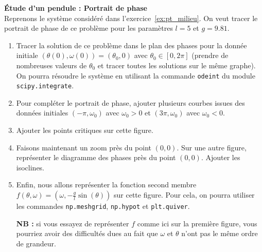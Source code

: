 \documentclass[12pt]{article}
\begin{document}
\begin{exo}\textbf{\'Etude d'un pendule : Portrait de phase}
  \label{ex:pendule}
  \\
  Reprenons le syst\`eme consid\'er\'e dans l'exercice~\ref{ex:pt_milieu}.
On veut tracer le portrait de phase de ce probl\`eme pour les param\`etres
$l=5$ et $g=9.81$.

\begin{enumerate}
\item Tracer la solution de ce probl\`eme dans le plan des phases pour la donn\'ee initiale
  $(\theta(0),\omega(0)) = (\theta_0,0)$ avec $\theta_0 \in [0 , 2\pi]$
  (prendre de nombreuses valeurs de $\theta_0$ et tracer toutes les solutions sur le m\^eme graphe).
  On pourra r\'esoudre le syst\`eme en utilisant la commande \texttt{odeint} du module \texttt{scipy.integrate}. 

\item Pour compl\'eter le portrait de phase, ajouter plusieurs
  courbes issues des donn\'ees initiales
  $(-\pi , \omega_0)$ avec $\omega_0 > 0$ et $(3\pi , \omega_0)$ avec $\omega_0 < 0$.
\item Ajouter les points critiques sur cette figure.
\item Faisons maintenant un zoom pr\`es du point $(0,0)$.
  Sur une autre figure, repr\'esenter le diagramme des phases pr\`es du point $(0,0)$.
  Ajouter les isoclines.
\item Enfin, nous allons repr\'esenter la fonction second membre $f(\theta,\omega) = (\omega, -\frac{g}{l}\sin(\theta))$ sur cette figure.
  Pour cela, on pourra utiliser les commandes \texttt{np.meshgrid}, \texttt{np.hypot}
  et \texttt{plt.quiver}.

  \textbf{NB :} si vous essayez de repr\'esenter $f$ comme ici sur la premi\`ere figure,
  vous pourriez avoir des difficult\'es dues au fait que $\omega$ et $\theta$
  n'ont pas le m\^eme ordre de grandeur.
\end{enumerate}
\end{exo}


%
\end{document}
